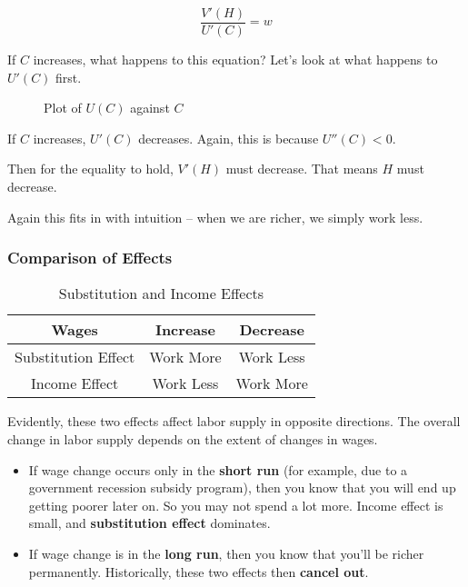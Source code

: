\documentclass[11pt]{scrartcl}
\begin{document}
\[\frac{V'(H)}{U'(C)} = w\]

If $C$ increases, what happens to this equation? Let's look at what happens to $U'(C)$ first.

\begin{figure}[ht!]
\centering
{}
\caption{Plot of $U(C)$ against $C$}
\end{figure}

If $C$ increases, $U'(C)$ decreases. Again, this is because $U''(C) < 0$.

Then for the equality to hold, $V'(H)$ must decrease. That means $H$ must decrease.

Again this fits in with intuition -- when we are richer, we simply work less.

\subsubsection{Comparison of Effects}

\begin{table}[ht!]
\begin{longtable}{c|cc}
\hline
Wages & Increase & Decrease \\
\hline
Substitution Effect & Work More & Work Less \\
Income Effect & Work Less & Work More \\
\hline
\end{longtable}
\caption{Substitution and Income Effects}
\end{table}

Evidently, these two effects affect labor supply in opposite directions. The overall change in labor supply depends on the extent of changes in wages.

\begin{itemize}
	\item If wage change occurs only in the \textbf{short run} (for example, due to a government recession subsidy program), then you know that you will end up getting poorer later on. So you may not spend a lot more. Income effect is small, and \textbf{substitution effect} dominates.
	\item If wage change is in the \textbf{long run}, then you know that you'll be richer permanently. Historically, these two effects then \textbf{cancel out}. 
\end{itemize}
\end{document}
